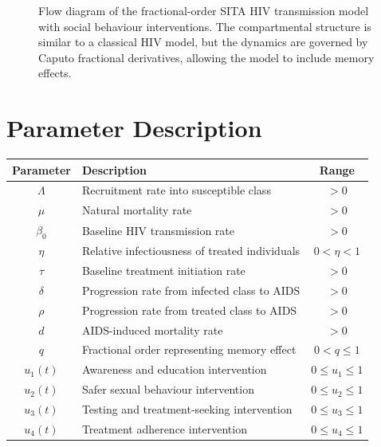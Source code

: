 \documentclass[12pt,a4paper,oneside]{report}
\newcommand{\CaputoD}[2]{{}^{C}D_{#1}^{#2}}
\begin{document}
\begin{figure}[H]
{}
\caption{Flow diagram of the fractional-order SITA HIV transmission model with social behaviour interventions. The compartmental structure is similar to a classical HIV model, but the dynamics are governed by Caputo fractional derivatives, allowing the model to include memory effects.}
\label{fig:fractional_model_diagram}
\end{figure}

\newpage 


\section{Parameter Description}
\begin{center}
\renewcommand{\arraystretch}{1.35}
\begin{tabular}{>{\bfseries}c p{7.5cm}c}
\toprule
Parameter & Description & Range\\
\midrule
$\Lambda$ & Recruitment rate into susceptible class & $>0$\\
$\mu$ & Natural mortality rate & $>0$\\
$\beta_0$ & Baseline HIV transmission rate & $>0$\\
$\eta$ & Relative infectiousness of treated individuals & $0<\eta<1$\\
$\tau$ & Baseline treatment initiation rate & $>0$\\
$\delta$ & Progression rate from infected class to AIDS & $>0$\\
$\rho$ & Progression rate from treated class to AIDS & $>0$\\
$d$ & AIDS-induced mortality rate & $>0$\\
$q$ & Fractional order representing memory effect & $0<q\leq1$\\
$u_1(t)$ & Awareness and education intervention & $0\leq u_1\leq1$\\
$u_2(t)$ & Safer sexual behaviour intervention & $0\leq u_2\leq1$\\
$u_3(t)$ & Testing and treatment-seeking intervention & $0\leq u_3\leq1$\\
$u_4(t)$ & Treatment adherence intervention & $0\leq u_4\leq1$\\
\bottomrule
\end{tabular}
\end{center}
\end{document}
